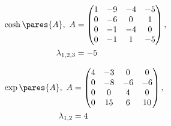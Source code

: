 \begin{multicols}{2}
\begin{enumtasks}
			\item \( \begin{aligned} \cosh \pares{A}, ~ A &= \begin{pmatrix} 1 & -9 & -4 & -5 \\ 0 & -6 & 0 & 1 \\ 0 & -1 & -4 & 0 \\ 0 & -1 & 1 & -5 \end{pmatrix}, \\ \lambda_{1, 2, 3} &= -5 \end{aligned} \) %
			\item \( \begin{aligned} \exp \pares{A}, ~ A &= \begin{pmatrix} 4 & -3 & 0 & 0 \\ 0 & -8 & -6 & -6 \\ 0 & 0 & 4 & 0 \\ 0 & 15 & 6 & 10 \end{pmatrix}, \\ \lambda_{1, 2} &= 4 \end{aligned} \) %
			

\end{enumtasks}
\end{multicols}
